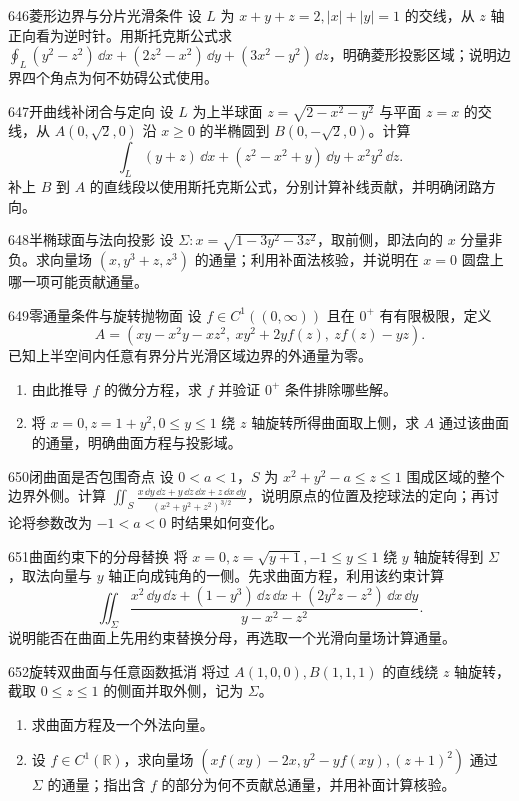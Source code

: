 \begin{exercise}{646}{菱形边界与分片光滑条件}
设 $L$ 为 $x+y+z=2,|x|+|y|=1$ 的交线，从 $z$ 轴正向看为逆时针。用斯托克斯公式求 $\oint_L(y^2-z^2)\,\dd x+(2z^2-x^2)\,\dd y+(3x^2-y^2)\,\dd z$，明确菱形投影区域；说明边界四个角点为何不妨碍公式使用。
\end{exercise}
\begin{exercise}{647}{开曲线补闭合与定向}
设 $L$ 为上半球面 $z=\sqrt{2-x^2-y^2}$ 与平面 $z=x$ 的交线，从 $A(0,\sqrt2,0)$ 沿 $x\ge0$ 的半椭圆到 $B(0,-\sqrt2,0)$。计算
\[\int_L(y+z)\,\dd x+(z^2-x^2+y)\,\dd y+x^2y^2\,\dd z.\]
补上 $B$ 到 $A$ 的直线段以使用斯托克斯公式，分别计算补线贡献，并明确闭路方向。
\end{exercise}
\begin{exercise}{648}{半椭球面与法向投影}
设 $\Sigma:x=\sqrt{1-3y^2-3z^2}$，取前侧，即法向的 $x$ 分量非负。求向量场 $(x,y^3+z,z^3)$ 的通量；利用补面法核验，并说明在 $x=0$ 圆盘上哪一项可能贡献通量。
\end{exercise}
\begin{exercise}{649}{零通量条件与旋转抛物面}
设 $f\in C^1((0,\infty))$ 且在 $0^+$ 有有限极限，定义
\[A=(xy-x^2y-xz^2,\ xy^2+2yf(z),\ zf(z)-yz).\]
已知上半空间内任意有界分片光滑区域边界的外通量为零。
\begin{enumerate}
\item 由此推导 $f$ 的微分方程，求 $f$ 并验证 $0^+$ 条件排除哪些解。
\item 将 $x=0,z=1+y^2,0\le y\le1$ 绕 $z$ 轴旋转所得曲面取上侧，求 $A$ 通过该曲面的通量，明确曲面方程与投影域。
\end{enumerate}
\end{exercise}
\begin{exercise}{650}{闭曲面是否包围奇点}
设 $0<a<1$，$S$ 为 $x^2+y^2-a\le z\le1$ 围成区域的整个边界外侧。计算 $\iint_S\frac{x\,\dd y\,\dd z+y\,\dd z\,\dd x+z\,\dd x\,\dd y}{(x^2+y^2+z^2)^{3/2}}$，说明原点的位置及挖球法的定向；再讨论将参数改为 $-1<a<0$ 时结果如何变化。
\end{exercise}
\begin{exercise}{651}{曲面约束下的分母替换}
将 $x=0,z=\sqrt{y+1},-1\le y\le1$ 绕 $y$ 轴旋转得到 $\Sigma$，取法向量与 $y$ 轴正向成钝角的一侧。先求曲面方程，利用该约束计算
\[\iint_{\Sigma}\frac{x^2\,\dd y\,\dd z+(1-y^3)\,\dd z\,\dd x+(2y^2z-z^2)\,\dd x\,\dd y}{y-x^2-z^2}.\]
说明能否在曲面上先用约束替换分母，再选取一个光滑向量场计算通量。
\end{exercise}
\begin{exercise}{652}{旋转双曲面与任意函数抵消}
将过 $A(1,0,0),B(1,1,1)$ 的直线绕 $z$ 轴旋转，截取 $0\le z\le1$ 的侧面并取外侧，记为 $\Sigma$。
\begin{enumerate}
\item 求曲面方程及一个外法向量。
\item 设 $f\in C^1(\mathbb R)$，求向量场 $(xf(xy)-2x,y^2-yf(xy),(z+1)^2)$ 通过 $\Sigma$ 的通量；指出含 $f$ 的部分为何不贡献总通量，并用补面计算核验。
\end{enumerate}
\end{exercise}
